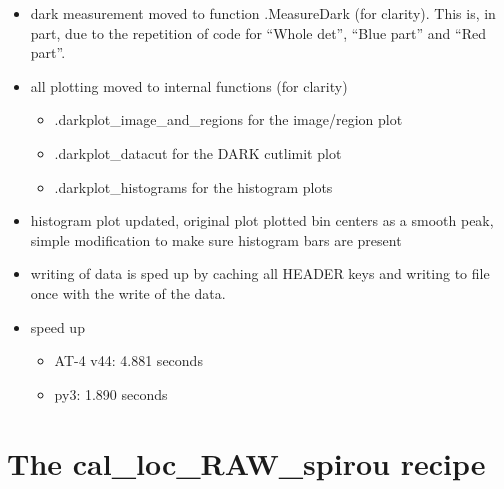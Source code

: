 \begin{itemize}

\item dark measurement moved to function \spirouImage.MeasureDark (for clarity). This is, in part, due to the repetition of code for ``Whole det'', ``Blue part'' and ``Red part''.

\item all plotting moved to internal functions (for clarity)
	\begin{itemize}
    \item \spirouPlot.darkplot\_image\_and\_regions for the image/region plot
    \item \spirouPlot.darkplot\_datacut for the DARK cutlimit plot
    \item \spirouPlot.darkplot\_histograms for the histogram plots 
    \end{itemize}

\item histogram plot updated, original plot plotted bin centers as a smooth peak, simple modification to make sure histogram bars are present
    
\item writing of data is sped up by caching all HEADER keys and writing to file once with the write of the data.

\item speed up
	\begin{itemize}
	\item AT-4 v44: 4.881 seconds
	\item py3: 1.890 seconds
	\end{itemize}

\end{itemize}

\section{The cal\_loc\_RAW\_spirou recipe}
\label{ch:changelog:At4:cal_loc_RAW_spirou}

